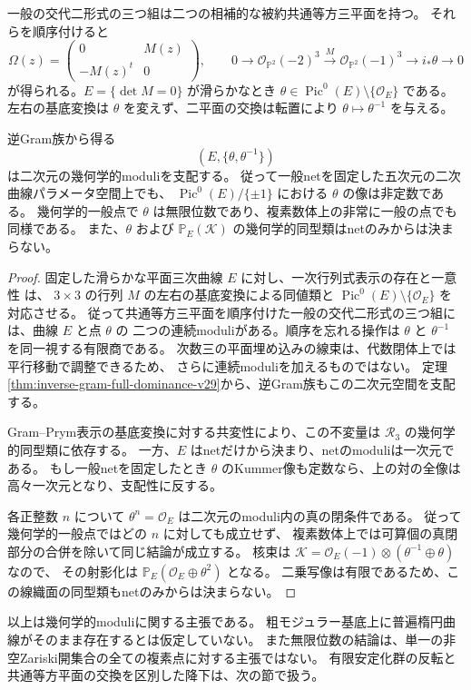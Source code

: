 一般の交代二形式の三つ組は二つの相補的な被約共通等方三平面を持つ。
それらを順序付けると
\[
 \Omega(z)=\begin{pmatrix}0&M(z)\\-M(z)^t&0\end{pmatrix},\qquad
 0\to\mathcal O_{\mathbb P^2}(-2)^3\xrightarrow{M}
 \mathcal O_{\mathbb P^2}(-1)^3\to i_*\theta\to0
\]
が得られる。$E=\{\det M=0\}$ が滑らかなとき
$\theta\in\operatorname{Pic}^0(E)\setminus\{\mathcal O_E\}$ である。
左右の基底変換は $\theta$ を変えず、二平面の交換は転置により
$\theta\mapsto\theta^{-1}$ を与える。

\begin{corollary}[第二の楕円moduliとnet非因子化]
\label{cor:ruled-two-moduli-v29}
逆Gram族から得る
\[
 (E,\{\theta,\theta^{-1}\})
\]
は二次元の幾何学的moduliを支配する。
従って一般netを固定した五次元の二次曲線パラメータ空間上でも、
$\operatorname{Pic}^0(E)/\{\pm1\}$ における $\theta$ の像は非定数である。
幾何学的一般点で $\theta$ は無限位数であり、複素数体上の非常に一般の点でも同様である。
また、$\theta$ および $\mathbb P_E(\mathcal K)$ の幾何学的同型類はnetのみからは決まらない。
\end{corollary}

\begin{proof}
固定した滑らかな平面三次曲線 $E$ に対し、一次行列式表示の存在と一意性
\cite[Propositions~3.1 and~3.3]{BeauvilleDeterminantal}は、
$3\times3$ の行列 $M$ の左右の基底変換による同値類と
$\operatorname{Pic}^0(E)\setminus\{\mathcal O_E\}$ を対応させる。
従って共通等方三平面を順序付けた一般の交代二形式の三つ組には、曲線 $E$ と点 $\theta$ の
二つの連続moduliがある。順序を忘れる操作は $\theta$ と $\theta^{-1}$ を同一視する有限商である。
次数三の平面埋め込みの線束は、代数閉体上では平行移動で調整できるため、
さらに連続moduliを加えるものではない。
定理\ref{thm:inverse-gram-full-dominance-v29}から、逆Gram族もこの二次元空間を支配する。

Gram--Prym表示の基底変換に対する共変性により、この不変量は
$\mathcal R_3$ の幾何学的同型類に依存する。
一方、$E$ はnetだけから決まり、netのmoduliは一次元である。
もし一般netを固定したとき $\theta$ のKummer像も定数なら、上の対の全像は
高々一次元となり、支配性に反する。

各正整数 $n$ について $\theta^n=\mathcal O_E$ は二次元のmoduli内の真の閉条件である。
従って幾何学的一般点ではどの $n$ に対しても成立せず、
複素数体上では可算個の真閉部分の合併を除いて同じ結論が成立する。
核束は $\mathcal K=\mathcal O_E(-1)\otimes(\theta^{-1}\oplus\theta)$ なので、
その射影化は $\mathbb P_E(\mathcal O_E\oplus\theta^2)$ となる。
二乗写像は有限であるため、この線織面の同型類もnetのみからは決まらない。
\end{proof}

以上は幾何学的moduliに関する主張である。
粗モジュラー基底上に普遍楕円曲線がそのまま存在するとは仮定していない。
また無限位数の結論は、単一の非空Zariski開集合の全ての複素点に対する主張ではない。
有限安定化群の反転と共通等方平面の交換を区別した降下は、次の節で扱う。
